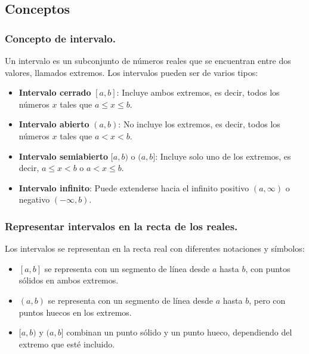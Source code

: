 \subsection{Conceptos}

\subsubsection{Concepto de intervalo.}

Un intervalo es un subconjunto de números reales que se encuentran entre dos valores, llamados extremos. Los intervalos pueden ser de varios tipos:

\begin{itemize}
    \item \textbf{Intervalo cerrado} \([a, b]\): Incluye ambos extremos, es decir, todos los números \(x\) tales que \(a \leq x \leq b\).
    \item \textbf{Intervalo abierto} \((a, b)\): No incluye los extremos, es decir, todos los números \(x\) tales que \(a < x < b\).
    \item \textbf{Intervalo semiabierto} \([a, b)\) o \((a, b]\): Incluye solo uno de los extremos, es decir, \(a \leq x < b\) o \(a < x \leq b\).
    \item \textbf{Intervalo infinito}: Puede extenderse hacia el infinito positivo \((a, \infty)\) o negativo \((-\infty, b)\).
\end{itemize}

\subsubsection{Representar intervalos en la recta de los reales.}

Los intervalos se representan en la recta real con diferentes notaciones y símbolos:

\begin{itemize}
    \item \([a, b]\) se representa con un segmento de línea desde \(a\) hasta \(b\), con puntos sólidos en ambos extremos.
    \item \((a, b)\) se representa con un segmento de línea desde \(a\) hasta \(b\), pero con puntos huecos en los extremos.
    \item \([a, b)\) y \((a, b]\) combinan un punto sólido y un punto hueco, dependiendo del extremo que esté incluido.
\end{itemize}

\begin{center}
\end{center}

